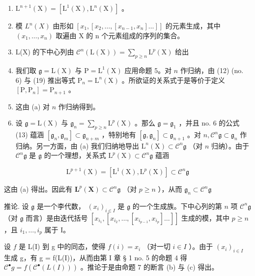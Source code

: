 \begin{enumerate}
\def\labelenumi{(\alph{enumi})}
\item
  \(\mathrm{L}^{n+1}(\mathrm{X}) = [\mathrm{L}^{1}(\mathrm{X}), \mathrm{L}^{n}(\mathrm{X})]\) 。
\item
  模 \(L^{n}(X)\) 由形如 \([x_{1}, [x_{2}, \ldots, [x_{n-1}, x_{n}] \ldots]]\) 的元素生成，其中 \((x_{1}, \ldots, x_{n})\) 取遍由 X 的 n 个元素组成的序列的集合。
\item
  L(X) 的下中心列由 \(\mathcal{C}^n (\mathrm{L}(\mathrm{X})) = \sum_{p\geqslant n}\mathrm{L}^p (\mathrm{X})\) 给出
\item
  我们取 \(\mathfrak{g} = \mathrm{L}(\mathrm{X})\) 与 \(\mathrm{P} = \mathrm{L}^{1}(\mathrm{X})\) 应用命题 5。对 \(n\) 作归纳，由 (12) (no. 6) 与 (19) 推出等式 \(\mathrm{P}_{n} = \mathrm{L}^{n}(\mathrm{X})\) 。所欲证的关系式于是等价于定义 \([\mathrm{P}, \mathrm{P}_{n}] = \mathrm{P}_{n + 1}\) 。
\item
  这由 (a) 对 \(n\) 作归纳得到。
\item
  设 \(\mathfrak{g} = \mathrm{L}(\mathrm{X})\) 与 \(\mathfrak{g}_{n} = \sum_{p\geqslant n}\mathrm{L}^{p}(\mathrm{X})\) 。那么 \(\mathfrak{g} = \mathfrak{g}_1\) ，并且 no. 6 的公式 (13) 蕴涵 \([\mathfrak{g}_{n},\mathfrak{g}_{m}]\subset \mathfrak{g}_{n + m}\) ，特别地有 \([\mathfrak{g},\mathfrak{g}_n]\subset \mathfrak{g}_{n + 1}\) 。对 \(n,\mathcal{C}^{n}\mathfrak{g}\subset \mathfrak{g}_{n}\) 作归纳。另一方面，由 (a) 我们归纳地导出 \(\mathrm{L}^{n}(\mathrm{X})\subset \mathcal{C}^{n}\mathfrak{g}\) （对 \(n\) 归纳）。由于 \(\mathcal{C}^{n}\mathfrak{g}\) 是 \(\mathfrak{g}\) 的一个理想，关系式 \(\mathrm{L}^p (\mathrm{X})\subset \mathcal{C}^{n}\mathfrak{g}\) 蕴涵
\end{enumerate}

\[
\mathrm{L} ^ {p + 1} (\mathrm{X}) = [ \mathrm{L} ^ {1} (\mathrm{X}), \mathrm{L} ^ {p} (\mathrm{X}) ] \subset \mathcal {C} ^ {n} \mathfrak {g}
\]

这由 (a) 得出。因此有 \(\mathbf{L}^p (\mathbf{X})\subset \mathcal{C}^{n}\mathfrak{g}\) （对 \(p\geqslant n\) ），从而 \(\mathfrak{g}_n\subset \mathcal{C}^{n}\mathfrak{g}\)

推论. 设 \(\mathfrak{g}\) 是一个李代数， \((x_{i})_{i\in I}\) 是 \(\mathfrak{g}\) 的一个生成族。下中心列的第 \(n\) 项 \(\mathcal{C}^{n}\mathfrak{g}\) （对 \(\mathfrak{g}\) 而言）是由迭代括号 \([x_{i_1}, [x_{i_2}, \ldots, [x_{i_{p-1}}, x_{i_p}] \ldots]]\) 生成的模，其中 \(p \geqslant n\) ，且 \(i_1, \ldots, i_p\) 属于 I。

设 \(f\) 是 L(I) 到 g 中的同态，使得 \(f(i) = x_i\) （对一切 \(i \in I\) ）。由于 \((x_i)_{i \in I}\) 生成 g，有 g = f(L(I))，从而由第 I 章 § 1 no. 5 的命题 4 得 \(\mathcal{C}^{\bullet}g = f(\mathcal{C}^{\bullet}(L(I)))\) 。推论于是由命题 7 的断言 (b) 与 (c) 得出。

